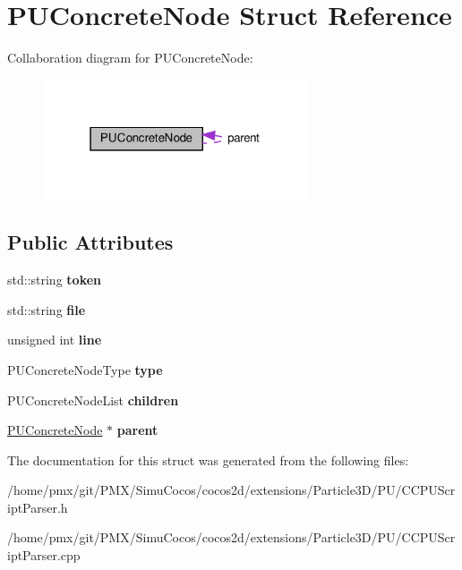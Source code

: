 \hypertarget{structPUConcreteNode}{}\section{P\+U\+Concrete\+Node Struct Reference}
\label{structPUConcreteNode}


Collaboration diagram for P\+U\+Concrete\+Node\+:
\nopagebreak
\begin{figure}[H]
\begin{center}
\leavevmode
\includegraphics[width=223pt]{structPUConcreteNode__coll__graph}
\end{center}
\end{figure}
\subsection*{Public Attributes}
\begin{DoxyCompactItemize}
\item 
\mbox{\label{structPUConcreteNode_a486a8026b497113baac970a63a764891}} 
std\+::string {\bfseries token}
\item 
\mbox{\label{structPUConcreteNode_ae2e384453079640a261271f6f6736422}} 
std\+::string {\bfseries file}
\item 
\mbox{\label{structPUConcreteNode_a51faa619750083af964f0da96478ae8d}} 
unsigned int {\bfseries line}
\item 
\mbox{\label{structPUConcreteNode_a2e026ae28997c7e56c472713d2dd3d2c}} 
P\+U\+Concrete\+Node\+Type {\bfseries type}
\item 
\mbox{\label{structPUConcreteNode_aa2c0f798ff04fb0709395cb47649ac46}} 
P\+U\+Concrete\+Node\+List {\bfseries children}
\item 
\mbox{\label{structPUConcreteNode_a2abfc54f9ef3d7119e1add5ed5bac144}} 
\hyperlink{structPUConcreteNode}{P\+U\+Concrete\+Node} $\ast$ {\bfseries parent}
\end{DoxyCompactItemize}


The documentation for this struct was generated from the following files\+:\begin{DoxyCompactItemize}
\item 
/home/pmx/git/\+P\+M\+X/\+Simu\+Cocos/cocos2d/extensions/\+Particle3\+D/\+P\+U/C\+C\+P\+U\+Script\+Parser.\+h\item 
/home/pmx/git/\+P\+M\+X/\+Simu\+Cocos/cocos2d/extensions/\+Particle3\+D/\+P\+U/C\+C\+P\+U\+Script\+Parser.\+cpp\end{DoxyCompactItemize}
